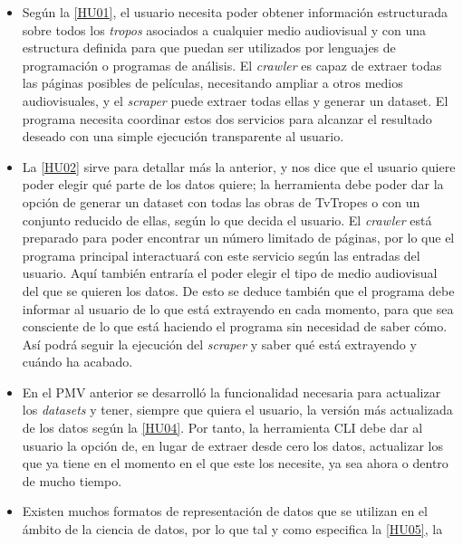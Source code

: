 \begin{itemize}
    \item Según la
    \href{https://github.com/jlgallego99/TropesToGo/issues/6}{[HU01]}, el
    usuario necesita poder obtener información estructurada sobre todos los
    \textit{tropos} asociados a cualquier medio audiovisual y con una estructura
    definida para que puedan ser utilizados por lenguajes de programación o
    programas de análisis. El \textit{crawler} es capaz de extraer todas las
    páginas posibles de películas, necesitando ampliar a otros medios
    audiovisuales, y el \textit{scraper} puede extraer todas ellas y generar un
    dataset. El programa necesita coordinar estos dos servicios para alcanzar el
    resultado deseado con una simple ejecución transparente al usuario.
    \item La \href{https://github.com/jlgallego99/TropesToGo/issues/7}{[HU02]}
    sirve para detallar más la anterior, y nos dice que el usuario quiere poder
    elegir qué parte de los datos quiere; la herramienta debe poder dar la
    opción de generar un dataset con todas las obras de TvTropes o con un
    conjunto reducido de ellas, según lo que decida el usuario. El
    \textit{crawler} está preparado para poder encontrar un número limitado de
    páginas, por lo que el programa principal interactuará con este servicio
    según las entradas del usuario. Aquí también entraría el poder elegir el
    tipo de medio audiovisual del que se quieren los datos. De esto se deduce
    también que el programa debe informar al usuario de lo que está extrayendo
    en cada momento, para que sea consciente de lo que está haciendo el programa
    sin necesidad de saber cómo. Así podrá seguir la ejecución del
    \textit{scraper} y saber qué está extrayendo y cuándo ha acabado.
    \item En el PMV anterior se desarrolló la funcionalidad necesaria para
    actualizar los \textit{datasets} y tener, siempre que quiera el usuario, la
    versión más actualizada de los datos según la
    \href{https://github.com/jlgallego99/TropesToGo/issues/9}{[HU04]}. Por
    tanto, la herramienta CLI debe dar al usuario la opción de, en lugar de extraer
    desde cero los datos, actualizar los que ya tiene en el momento en el que
    este los necesite, ya sea ahora o dentro de mucho tiempo.
    \item Existen muchos formatos de representación de datos que se utilizan en
    el ámbito de la ciencia de datos, por lo que tal y como especifica la
    \href{https://github.com/jlgallego99/TropesToGo/issues/30}{[HU05]}, la

\end{itemize}
